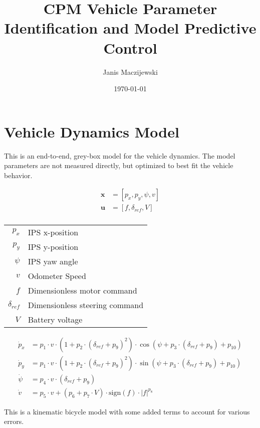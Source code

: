 \documentclass[12pt]{article}
\title{CPM Vehicle Parameter Identification and Model Predictive Control}
\author{Janis Maczijewski}
\date{\today}
\begin{document}
\maketitle

\section{Vehicle Dynamics Model}


This is an end-to-end, grey-box model for the vehicle dynamics. The model parameters are not measured directly, but optimized to best fit the vehicle behavior.

\begin{align*}
\boldsymbol{x} &= [p_x, p_y, \psi, v] \\
\boldsymbol{u} &= [f, \delta_{ref}, V] \\ 
\end{align*}



\begin{center}
\begin{tabular}{ r | l }
 $p_x$ & IPS x-position  \\ 
 $p_y$ & IPS y-position   \\ 
 $\psi$ & IPS yaw angle  \\ 
 $v$ & Odometer Speed  \\ 
 $f$ & Dimensionless motor command  \\ 
 $\delta_{ref}$ & Dimensionless steering command  \\ 
 $V$ & Battery voltage  \\ 
\end{tabular}
\end{center}


\begin{align*}
\dot{p}_x &= p_1 \cdot v \cdot (1+p_2 \cdot (\delta_{ref} + p_{9})^2) \cdot \cos(\psi + p_3 \cdot (\delta_{ref} + p_{9}) + p_{10}) \\
\dot{p}_y &= p_1 \cdot v \cdot (1+p_2 \cdot (\delta_{ref} + p_{9})^2) \cdot \sin(\psi + p_3 \cdot (\delta_{ref} + p_{9}) + p_{10}) \\
\dot{\psi} &= p_4 \cdot v \cdot (\delta_{ref} + p_{9}) \\
\dot{v} &= p_5 \cdot v + (p_6 + p_7 \cdot V) \cdot \text{sign}(f) \cdot |f|^{p_8}
\end{align*}

This is a kinematic bicycle model with some added terms to account for various errors.
\end{document}

